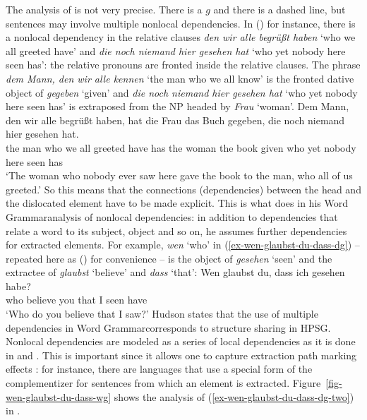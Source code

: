 The analysis of \citet{GO2009a} is not very precise. There is a $g$ and there is a dashed line, but
sentences may involve multiple nonlocal dependencies. In () for instance, there is a nonlocal dependency
in the relative clauses \emph{den wir alle begrüßt haben} `who we all greeted have' and \emph{die noch niemand hier
  gesehen hat} `who yet nobody here seen has': the relative pronouns are fronted inside the relative clauses. The phrase \emph{dem Mann, den wir alle
  kennen} `the man who we all know' is the fronted dative object of \emph{gegeben} `given' and \emph{die noch niemand hier gesehen
  hat} `who yet nobody here seen has' is extraposed from the NP headed by \emph{Frau} `woman'.
\ea
\gll Dem Mann, den wir alle begrüßt haben, hat die Frau das Buch gegeben, die noch niemand hier gesehen hat.\\
     the man   who we all greeted have      has the woman the book given who yet nobody here seen has\\
\glt `The woman  who nobody ever saw here gave the book to the man, who all of us greeted.'
\z
So this means that the connections (dependencies) between the head and the dislocated element have
to be made explicit. This is what \citet{Hudson97a,Hudson2000a} does in his Word
Grammar\indexwg analysis of nonlocal dependencies: in addition to dependencies that relate a word to
its subject, object and so on, he assumes further dependencies for extracted elements. For example,
\emph{wen} `who' in (\ref{ex-wen-glaubst-du-dass-dg}) -- repeated here as () for convenience -- is the object of \emph{gesehen} `seen' and the extractee of
\emph{glaubst} `believe' and \emph{dass} `that': 
\ea
\label{ex-wen-glaubst-du-dass-dg-two}
\gll Wen glaubst du, dass ich gesehen habe?\\
     who believe you that I seen have\\
\glt `Who do you believe that I saw?'
\z
Hudson states that the use of multiple dependencies in Word Grammar\indexwg corresponds to structure
sharing in HPSG\indexhpsg \citep[]{Hudson97a}. Nonlocal dependencies are modeled as a series
of local dependencies as it is done in \gpsg and \hpsg. This is important since it allows one to
capture extraction path marking effects \citep*[--2, Section~3.2]{BMS2001a}: for instance,
there are languages that use a special form of the complementizer for sentences from which an
element is extracted. Figure~\vref{fig-wen-glaubst-du-dass-wg} shows the analysis of
(\ref{ex-wen-glaubst-du-dass-dg-two}) in \wg.
